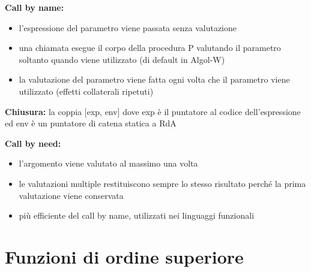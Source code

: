 \documentclass[12pt]{extarticle}
\begin{document}
\begin{flushleft}
\begin{itemize}
\end{itemize}

\medskip

\textbf{Call by name:} \\
\begin{itemize}
    \item l'espressione del parametro viene passata senza valutazione
    \item una chiamata esegue il corpo della procedura P valutando il parametro soltanto quando viene utilizzato (di default in Algol-W)
    \item la valutazione del parametro viene fatta ogni volta che il parametro viene utilizzato (effetti collaterali ripetuti)
\end{itemize}

\medskip

\textbf{Chiusura:} la coppia [exp, env] dove exp è il puntatore al codice dell'espressione ed env è un puntatore di catena statica a RdA \\

\medskip

\textbf{Call by  need:}
\begin{itemize}
    \item l'argomento viene valutato al massimo una volta
    \item le valutazioni multiple restituiscono sempre lo stesso risultato perché la prima valutazione viene conservata
    \item più efficiente del call by name, utilizzati nei linguaggi funzionali
\end{itemize}

\medskip

\end{flushleft}
 

\section*{Funzioni di ordine superiore}
\end{document}
